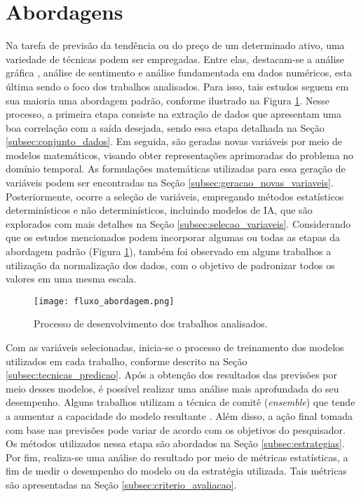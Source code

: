 \section{Abordagens}
\label{subsec:abordagem}
Na tarefa de previsão da tendência ou do preço de um determinado ativo, uma variedade de técnicas podem ser empregadas. Entre elas, destacam-se a análise gráfica \cite{matsura2017comprar}, análise de sentimento \cite{igarashi2021analise} e análise fundamentada em dados numéricos, esta última sendo o foco dos trabalhos analisados. Para isso, tais estudos seguem em sua maioria uma abordagem padrão, conforme ilustrado na Figura \ref{fig:abordagemPadrao}. Nesse processo, a primeira etapa consiste na extração de dados que apresentam uma boa correlação com a saída desejada, sendo essa etapa detalhada na Seção \ref{subsec:conjunto_dados}. Em seguida, são geradas novas variáveis por meio de modelos matemáticos, visando obter representações aprimoradas do problema no domínio temporal. As formulações matemáticas utilizadas para essa geração de variáveis podem ser encontradas na Seção \ref{subsec:geracao_novas_variaveis}. Posteriormente, ocorre a seleção de variáveis, empregando métodos estatísticos determinísticos e não determinísticos, incluindo modelos de \ac{IA}, que são explorados com mais detalhes na Seção \ref{subsec:selecao_variaveis}. Considerando que os estudos mencionados podem incorporar algumas ou todas as etapas da abordagem padrão (Figura \ref{fig:abordagemPadrao}), também foi observado em alguns trabalhos a utilização da normalização dos dados, com o objetivo de padronizar todos os valores em uma mesma escala.

\begin{figure}[htbp]
    \caption{Processo de desenvolvimento dos trabalhos analisados.}
      \centering
      \texttt{[image: fluxo\_abordagem.png]} 
    \label{fig:abordagemPadrao}
\end{figure}

Com as variáveis selecionadas, inicia-se o processo de treinamento dos modelos utilizados em cada trabalho, conforme descrito na Seção \ref{subsec:tecnicas_predicao}. Após a obtenção dos resultados das previsões por meio desses modelos, é possível realizar uma análise mais aprofundada do seu desempenho. Alguns trabalhos utilizam a técnica de comitê (\textit{ensemble}) que tende a aumentar a capacidade do modelo resultante \cite{sagi2018ensemble}. Além disso, a ação final tomada com base nas previsões pode variar de acordo com os objetivos do pesquisador. Os métodos utilizados nessa etapa são abordados na Seção \ref{subsec:estrategias}. Por fim, realiza-se uma análise do resultado por meio de métricas estatísticas, a fim de medir o desempenho do modelo ou da estratégia utilizada. Tais métricas são apresentadas na Seção \ref{subsec:criterio_avaliacao}. 



